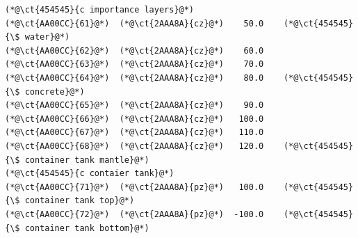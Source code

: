 \newpage
\begin{lstlisting}[firstnumber=last]
(*@\ct{454545}{c importance layers}@*)
(*@\ct{AA00CC}{61}@*)  (*@\ct{2AAA8A}{cz}@*)    50.0    (*@\ct{454545}{\$ water}@*)
(*@\ct{AA00CC}{62}@*)  (*@\ct{2AAA8A}{cz}@*)    60.0
(*@\ct{AA00CC}{63}@*)  (*@\ct{2AAA8A}{cz}@*)    70.0
(*@\ct{AA00CC}{64}@*)  (*@\ct{2AAA8A}{cz}@*)    80.0    (*@\ct{454545}{\$ concrete}@*)
(*@\ct{AA00CC}{65}@*)  (*@\ct{2AAA8A}{cz}@*)    90.0
(*@\ct{AA00CC}{66}@*)  (*@\ct{2AAA8A}{cz}@*)   100.0
(*@\ct{AA00CC}{67}@*)  (*@\ct{2AAA8A}{cz}@*)   110.0
(*@\ct{AA00CC}{68}@*)  (*@\ct{2AAA8A}{cz}@*)   120.0    (*@\ct{454545}{\$ container tank mantle}@*)
(*@\ct{454545}{c contaier tank}@*)
(*@\ct{AA00CC}{71}@*)  (*@\ct{2AAA8A}{pz}@*)   100.0    (*@\ct{454545}{\$ container tank top}@*)
(*@\ct{AA00CC}{72}@*)  (*@\ct{2AAA8A}{pz}@*)  -100.0    (*@\ct{454545}{\$ container tank bottom}@*)


\end{lstlisting}
